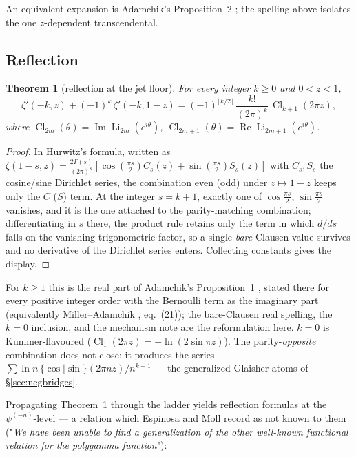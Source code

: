 \documentclass[11pt]{article}
\newtheorem{theorem}{Theorem}[section]
\theoremstyle{remark}
\begin{document}
An equivalent expansion is Adamchik's Proposition~2 \cite{Adamchik98}; the
spelling above isolates the one $z$-dependent transcendental.

\subsection{Reflection}

\begin{theorem}[reflection at the jet floor]\label{thm:negrefl}
For every integer $k\ge0$ and $0<z<1$,
\[
\zeta'(-k,z)+(-1)^k\,\zeta'(-k,1-z)
=(-1)^{\lfloor k/2\rfloor}\,\frac{k!}{(2\pi)^k}\,
\operatorname{Cl}_{k+1}(2\pi z),
\]
where $\operatorname{Cl}_{2m}(\theta)=\operatorname{Im}\operatorname{Li}_{2m}(e^{i\theta})$,
$\operatorname{Cl}_{2m+1}(\theta)=\operatorname{Re}\operatorname{Li}_{2m+1}(e^{i\theta})$.
\end{theorem}

\begin{proof}
In Hurwitz's formula, written as
$\zeta(1-s,z)=\tfrac{2\Gamma(s)}{(2\pi)^s}
[\cos(\tfrac{\pi s}{2})C_s(z)+\sin(\tfrac{\pi s}{2})S_s(z)]$ with
$C_s,S_s$ the cosine/sine Dirichlet series, the combination even (odd)
under $z\mapsto1-z$ keeps only the $C$ ($S$) term. At the integer
$s=k+1$, exactly one of $\cos\tfrac{\pi s}{2}$, $\sin\tfrac{\pi s}{2}$
vanishes, and it is the one attached to the parity-matching combination;
differentiating in $s$ there, the product rule retains only the term in
which $d/ds$ falls on the vanishing trigonometric factor, so a single
\emph{bare} Clausen value survives and no derivative of the Dirichlet
series enters. Collecting constants gives the display.
\end{proof}

For $k\ge1$ this is the real part of Adamchik's Proposition~1
\cite{Adamchik98}, stated there for every positive integer order with the
Bernoulli term as the imaginary part (equivalently Miller--Adamchik
\cite{MillerAdamchik}, eq.~(21)); the bare-Clausen real spelling, the
$k=0$ inclusion, and the mechanism note are the reformulation here. $k=0$
is Kummer-flavoured ($\operatorname{Cl}_1(2\pi z)=-\ln(2\sin\pi z)$). The
parity-\emph{opposite} combination does not close: it produces the series
$\sum\ln n\,\{\cos|\sin\}(2\pi nz)/n^{k+1}$ — the generalized-Glaisher
atoms of \S\ref{sec:negbridges}.

Propagating Theorem~\ref{thm:negrefl} through the ladder yields reflection
formulas at the $\psi^{(-n)}$-level — a relation which Espinosa and Moll
\cite{EspinosaMoll04} record as not known to them ("\emph{We have been
unable to find a generalization of the other well-known functional
relation for the polygamma function}"):
\end{document}
